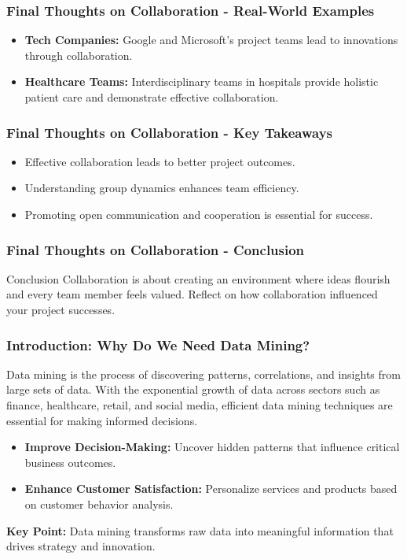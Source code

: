\documentclass[aspectratio=169]{beamer}
\begin{document}
\begin{frame}[fragile]
    \frametitle{Final Thoughts on Collaboration - Real-World Examples}
    \begin{itemize}
        \item \textbf{Tech Companies:} Google and Microsoft's project teams lead to innovations through collaboration.
        \item \textbf{Healthcare Teams:} Interdisciplinary teams in hospitals provide holistic patient care and demonstrate effective collaboration.
    \end{itemize}
\end{frame}

\begin{frame}[fragile]
    \frametitle{Final Thoughts on Collaboration - Key Takeaways}
    \begin{itemize}
        \item Effective collaboration leads to better project outcomes.
        \item Understanding group dynamics enhances team efficiency.
        \item Promoting open communication and cooperation is essential for success.
    \end{itemize}
\end{frame}

\begin{frame}[fragile]
    \frametitle{Final Thoughts on Collaboration - Conclusion}
    \begin{block}{Conclusion}
        Collaboration is about creating an environment where ideas flourish and every team member feels valued. Reflect on how collaboration influenced your project successes.
    \end{block}
\end{frame}

\begin{frame}[fragile]
    \frametitle{Introduction: Why Do We Need Data Mining?}
    Data mining is the process of discovering patterns, correlations, and insights from large sets of data. 
    With the exponential growth of data across sectors such as finance, healthcare, retail, and social media, efficient data mining techniques are essential for making informed decisions.
    
    \begin{itemize}
        \item \textbf{Improve Decision-Making:} Uncover hidden patterns that influence critical business outcomes.
        \item \textbf{Enhance Customer Satisfaction:} Personalize services and products based on customer behavior analysis.
    \end{itemize}
    
    \textbf{Key Point:} Data mining transforms raw data into meaningful information that drives strategy and innovation.
\end{frame}
\end{document}
